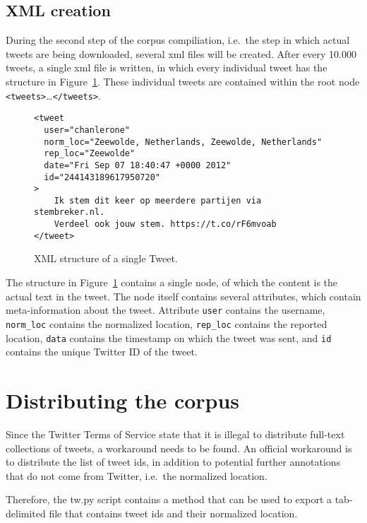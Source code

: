\documentclass[a4paper,11pt]{article}
\begin{document}
\subsection{XML creation}

During the second step of the corpus compiliation, i.e.~the step in which actual tweets are being downloaded, several xml files will be created. After every 10.000 tweets, a single xml file is written, in which every individual tweet has the structure in Figure~\ref{fig:xml}. These individual tweets are contained within the root node \texttt{<tweets>}\ldots\texttt{</tweets>}.

\begin{figure}[htbp]
\begin{verbatim}
<tweet
  user="chanlerone" 
  norm_loc="Zeewolde, Netherlands, Zeewolde, Netherlands" 
  rep_loc="Zeewolde" 
  date="Fri Sep 07 18:40:47 +0000 2012" 
  id="244143189617950720"
>
    Ik stem dit keer op meerdere partijen via stembreker.nl.
    Verdeel ook jouw stem. https://t.co/rF6mvoab
</tweet>

\end{verbatim}
\caption{XML structure of a single Tweet.}
\label{fig:xml}
\end{figure}

The structure in Figure~\ref{fig:xml} contains a single node, of which the content is the actual text in the tweet. The node itself contains several attributes, which contain meta-information about the tweet. Attribute \texttt{user} contains the username, \texttt{norm\_loc} contains the normalized location, \texttt{rep\_loc} contains the reported location, \texttt{data} contains the timestamp on which the tweet was sent, and \texttt{id} contains the unique Twitter ID of the tweet.

\section{Distributing the corpus}

Since the Twitter Terms of Service state that it is illegal to distribute full-text collections of tweets, a workaround needs to be found. An official workaround is to distribute the list of tweet ids, in addition to potential further annotations that do not come from Twitter, i.e.~the normalized location.

Therefore, the tw.py script contains a method that can be used to export a tab-delimited file that contains tweet ids and their normalized location.
\end{document}
